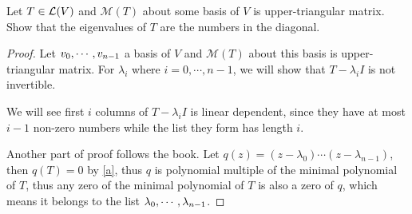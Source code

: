 \documentclass[../main.tex]{subfiles}
\begin{document}
\begin{theorem}
  \label{T5.41}
  Let $T \in \mathcal{L}(V)$ and $\mathcal{M}(T)$ about some basis of $V$ is upper-triangular matrix.
  Show that the eigenvalues of $T$ are the numbers in the diagonal.
\end{theorem}
\begin{proof}
  Let $v_0 , \cdots , v_{n - 1}$ a basis of $V$ and $\mathcal{M}(T)$ about this basis is upper-triangular matrix.
  For $\lambda_i$ where $i = 0, \cdots, n - 1$, we will show that $T - \lambda_i I$ is
  not invertible.

  We will see first $i$ columns of $T - \lambda_i I$ is linear dependent,
  since they have at most $i - 1$ non-zero numbers while the list they form has length $i$.

  Another part of proof follows the book.
  Let $q(z) = (z - \lambda_0) \cdots (z - \lambda_{n - 1})$, then $q(T) = 0$
  by \ref{a}, thus $q$ is polynomial multiple of the minimal polynomial of $T$,
  thus any zero of the minimal polynomial of $T$ is also a zero of $q$, which means
  it belongs to the list $\lambda_0 , \cdots , \lambda_{n - 1}$.
\end{proof}
\end{document}
